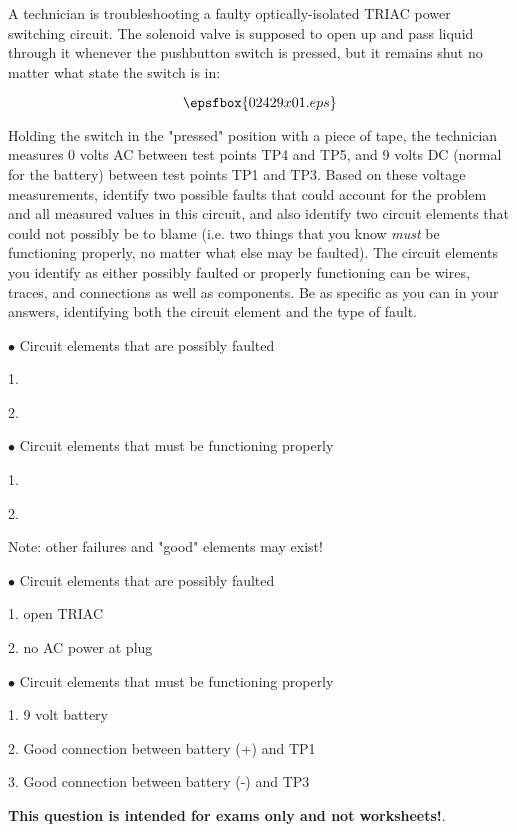 

A technician is troubleshooting a faulty optically-isolated TRIAC power switching circuit.  The solenoid valve is supposed to open up and pass liquid through it whenever the pushbutton switch is pressed, but it remains shut no matter what state the switch is in:

$$\epsfbox{02429x01.eps}$$

Holding the switch in the "pressed" position with a piece of tape, the technician measures 0 volts AC between test points TP4 and TP5, and 9 volts DC (normal for the battery) between test points TP1 and TP3.  Based on these voltage measurements, identify two possible faults that could account for the problem and all measured values in this circuit, and also identify two circuit elements that could not possibly be to blame (i.e. two things that you know {\it must} be functioning properly, no matter what else may be faulted).  The circuit elements you identify as either possibly faulted or properly functioning can be wires, traces, and connections as well as components.  Be as specific as you can in your answers, identifying both the circuit element and the type of fault.

\medskip
\item{$\bullet$} Circuit elements that are possibly faulted
\item{1.} 
\item{2.} 
\medskip

\medskip
\item{$\bullet$} Circuit elements that must be functioning properly
\item{1.} 
\item{2.} 
\medskip







Note: other failures and "good" elements may exist!

\medskip
\item{$\bullet$} Circuit elements that are possibly faulted
\item{1.} open TRIAC 
\item{2.} no AC power at plug
\medskip

\medskip
\item{$\bullet$} Circuit elements that must be functioning properly
\item{1.} 9 volt battery
\item{2.} Good connection between battery (+) and TP1
\item{3.} Good connection between battery (-) and TP3
\medskip







{\bf This question is intended for exams only and not worksheets!}.




